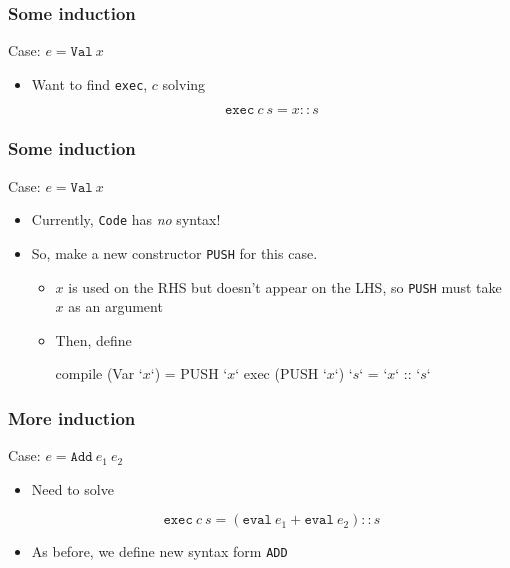 \documentclass[usenames,dvipsnames]{beamer}
\begin{document}

\begin{frame}[fragile]
  \frametitle{Some induction}
  \begin{totop}
    Case: $e = \texttt{Val}\ x$
  \end{totop}

  \begin{itemize}
    \item Want to find \texttt{exec}, $c$ solving

      \begin{equation}
        \texttt{exec}\ c\ s = x :: s
      \end{equation}
  \end{itemize}
\end{frame}


\begin{frame}[fragile]
  \frametitle{Some induction}
  \begin{totop}
    Case: $e = \texttt{Val}\ x$
  \end{totop}

  \begin{itemize}
    \item Currently, \texttt{Code} has \emph{no} syntax!

    \item So, make a new constructor \texttt{PUSH} for this case.
      \begin{itemize}
        \item $x$ is used on the RHS but doesn't appear on the LHS, so
          \texttt{PUSH} must take $x$ as an argument

        \item Then, define

          \begin{code}
            compile (Var `$x$`) = PUSH `$x$`
            exec (PUSH `$x$`) `$s$` = `$x$` :: `$s$`
          \end{code}
      \end{itemize}
  \end{itemize}
\end{frame}


\begin{frame}[fragile]
  \frametitle{More induction}
  \begin{totop}
    Case: $e = \texttt{Add}\ e_1\ e_2$
  \end{totop}

  \begin{itemize}
    \item Need to solve

      \begin{equation}
        \texttt{exec}\ c\ s = (\texttt{eval}\ e_1 + \texttt{eval}\ e_2) :: s
      \end{equation}

    \item As before, we define new syntax form \texttt{ADD}
  \end{itemize}
\end{frame}
\end{document}
